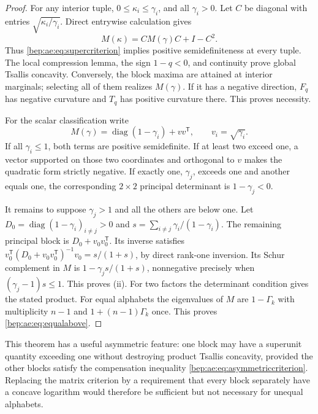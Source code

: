 \documentclass[11pt]{article}
\numberwithin{equation}{section}
\theoremstyle{definition}
\theoremstyle{remark}
\newcommand{\diag}{\operatorname{diag}}
\begin{document}
\begin{proof}
For any interior tuple, $0\leq\kappa_i\leq\gamma_i$, and all
$\gamma_i>0$. Let $C$ be diagonal with entries
$\sqrt{\kappa_i/\gamma_i}$. Direct entrywise calculation gives
\begin{equation}\label{bep:ae:eq:matrixmonotone}
 M(\kappa)=CM(\gamma)C+I-C^2.
\end{equation}
Thus \eqref{bep:ae:eq:supercriterion} implies positive semidefiniteness at
every tuple. The local compression lemma, the sign $1-q<0$, and
continuity prove global Tsallis concavity. Conversely, the block maxima
are attained at interior marginals; selecting all of them realizes
$M(\gamma)$. If it has a negative direction, $F_q$ has negative
curvature and $T_q$ has positive curvature there. This proves necessity.

For the scalar classification write
\[
 M(\gamma)=\diag(1-\gamma_i)+vv^{\mathsf T},\qquad v_i=\sqrt{\gamma_i}.
\]
If all $\gamma_i\leq1$, both terms are positive semidefinite. If at
least two exceed one, a vector supported on those two coordinates and
orthogonal to $v$ makes the quadratic form strictly negative. If
exactly one, $\gamma_j$, exceeds one and another equals one, the
corresponding $2\times2$ principal determinant is $1-\gamma_j<0$.

It remains to suppose $\gamma_j>1$ and all the others are below one.
Let $D_0=\diag(1-\gamma_i)_{i\ne j}>0$ and
$s=\sum_{i\ne j}\gamma_i/(1-\gamma_i)$. The remaining principal block
is $D_0+v_0v_0^{\mathsf T}$. Its inverse satisfies
$v_0^{\mathsf T}(D_0+v_0v_0^{\mathsf T})^{-1}v_0=s/(1+s)$,
by direct rank-one inversion. Its Schur complement in $M$ is
$1-\gamma_j s/(1+s)$, nonnegative precisely when
$(\gamma_j-1)s\leq1$. This proves (ii).
For two factors the determinant condition gives the stated product.
For equal alphabets the eigenvalues of $M$ are
$1-\Gamma_k$ with multiplicity $n-1$ and
$1+(n-1)\Gamma_k$ once. This proves \eqref{bep:ae:eq:equalabove}.
\end{proof}

This theorem has a useful asymmetric feature: one block may have a
superunit quantity exceeding one without destroying product Tsallis
concavity, provided the other blocks satisfy the compensation inequality
\eqref{bep:ae:eq:asymmetriccriterion}. Replacing the matrix criterion by a
requirement that every block separately have a concave logarithm would
therefore be sufficient but not necessary for unequal alphabets.
\end{document}
